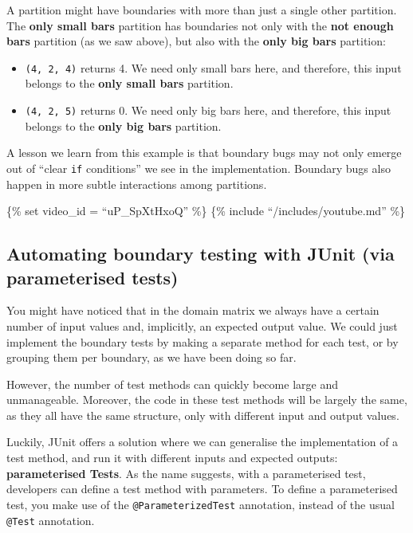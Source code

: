 A partition might have boundaries with more than just a single other
partition. The \textbf{only small bars} partition has boundaries not
only with the \textbf{not enough bars} partition (as we saw above), but
also with the \textbf{only big bars} partition:

\begin{itemize}
\tightlist
\item
  \texttt{(4,\ 2,\ 4)} returns 4. We need only small bars here, and
  therefore, this input belongs to the \textbf{only small bars}
  partition.
\item
  \texttt{(4,\ 2,\ 5)} returns 0. We need only big bars here, and
  therefore, this input belongs to the \textbf{only big bars} partition.
\end{itemize}

A lesson we learn from this example is that boundary bugs may not only
emerge out of ``clear \texttt{if} conditions'' we see in the
implementation. Boundary bugs also happen in more subtle interactions
among partitions.

\{\% set video\_id = ``uP\_SpXtHxoQ'' \%\} \{\% include
``/includes/youtube.md'' \%\}

\hypertarget{automating-boundary-testing-with-junit-via-parameterised-tests}{%
\subsection{Automating boundary testing with JUnit (via parameterised
tests)}\label{automating-boundary-testing-with-junit-via-parameterised-tests}}

You might have noticed that in the domain matrix we always have a
certain number of input values and, implicitly, an expected output
value. We could just implement the boundary tests by making a separate
method for each test, or by grouping them per boundary, as we have been
doing so far.

However, the number of test methods can quickly become large and
unmanageable. Moreover, the code in these test methods will be largely
the same, as they all have the same structure, only with different input
and output values.

Luckily, JUnit offers a solution where we can generalise the
implementation of a test method, and run it with different inputs and
expected outputs: \textbf{parameterised Tests}. As the name suggests,
with a parameterised test, developers can define a test method with
parameters. To define a parameterised test, you make use of the
\texttt{@ParameterizedTest} annotation, instead of the usual
\texttt{@Test} annotation.

